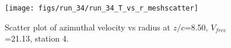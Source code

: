 \begin{figure}[H]
\centering
\texttt{[image: figs/run\_34/run\_34\_T\_vs\_r\_meshscatter]}
\caption{Scatter plot of azimuthal velocity vs radius at $z/c$=8.50, $V_{free}$=21.13, station 4.}
\label{fig:run_34_T_vs_r_meshscatter}
\end{figure}


